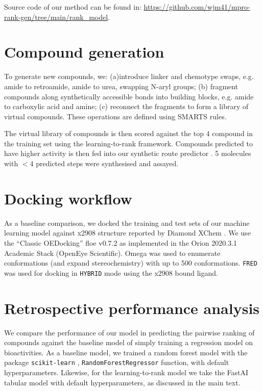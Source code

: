 \documentclass[12pt,aps,showpacs,superscriptaddress,footinbib,preprint,noshowpacs]{revtex4-1}
\begin{document}
Source code of our method can be found in: \url{https://github.com/wjm41/mpro-rank-gen/tree/main/rank_model}.  
\section{Compound generation} 
To generate new compounds, we: (a)introduce linker and chemotype swaps, e.g. amide to retroamide, amide to urea, swapping N-aryl groups; (b) fragment compounds along synthetically accessible bonds into building blocks, e.g. amide to carboxylic acid and amine; (c) reconnect the fragments to form a library of virtual compounds. These operations are defined using SMARTS rules. 

The virtual library of compounds is then scored against the top 4 compound in the training set using the learning-to-rank framework. Compounds predicted to have higher activity is then fed into our synthetic route predictor \cite{schwaller2019molecular,yang2019molecular}. 5 molecules with $<$4 predicted steps were synthesised and assayed. 


\section{Docking workflow} 

As a baseline comparison, we docked the training and test sets of our machine learning model against x2908 structure reported by Diamond XChem \cite{douangamath2020crystallographic}.  We use the ``Classic OEDocking'' floe v0.7.2 as implemented in the Orion 2020.3.1 Academic Stack (OpenEye Scientific). Omega was used to enumerate conformations (and expand stereochemistry) with up to 500 conformations. \texttt{FRED} was used for docking in \texttt{HYBRID} mode using the x2908 bound ligand. 


\section{Retrospective performance analysis} 

We compare the performance of our model in predicting the pairwise ranking of compounds against the baseline model of simply training a regression model on bioactivities. As a baseline model, we trained a random forest model with the package \texttt{scikit-learn} \cite{scikit-learn}, \texttt{RandomForestRegressor} function, with default hyperparameters. Likewise, for the learning-to-rank model we take the FastAI tabular model with default hyperparameters, as discussed in the main text. 
\end{document}
